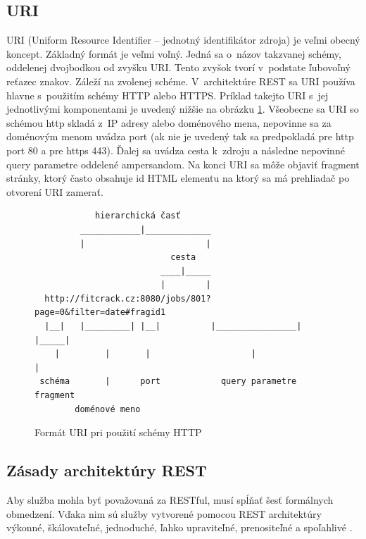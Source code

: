 \documentclass[slovak]{fitthesis}
\begin{document}
\subsection{URI} \label{URI}
URI (Uniform Resource Identifier – jednotný identifikátor zdroja) je veľmi obecný koncept. Základný formát je veľmi voľný. Jedná sa o~názov takzvanej schémy, oddelenej dvojbodkou od zvyšku URI. Tento zvyšok tvorí v~podstate ľubovoľný reťazec znakov. Záleží na zvolenej schéme\cite{URIRFC}. V~architektúre REST sa URI používa hlavne s~použitím schémy HTTP alebo HTTPS. Príklad takejto URI s~jej jednotlivými komponentami je uvedený nižšie na obrázku \ref{fig:formatURI}. Všeobecne sa URI so schémou http skladá z~IP adresy alebo doménového mena, nepovinne sa za doménovým menom uvádza port (ak nie je uvedený tak sa predpokladá pre http port 80 a pre https 443). Ďalej sa uvádza cesta k~zdroju a následne nepovinné query parametre oddelené ampersandom. Na konci URI sa môže objaviť fragment stránky, ktorý často obsahuje id HTML elementu na ktorý sa má prehliadač po otvorení URI zamerať.



\begin{figure}[H]
\begin{center}
\begin{varwidth}{\linewidth}
\begin{verbatim}
            hierarchická časť
         ____________|_____________                  
         |                        |
                           cesta
                         ____|_____
                         |        |
  http://fitcrack.cz:8080/jobs/801?page=0&filter=date#fragid1
  |__|   |_________| |__|          |________________| |_____|
    |         |       |                    |               |
 schéma       |      port            query parametre    fragment
        doménové meno

\end{verbatim}
\end{varwidth}
\end{center}
\caption{Formát URI pri použití schémy HTTP}
\label{fig:formatURI}
\end{figure}



\subsection{Zásady architektúry REST} \label{zasadyREST}
Aby služba mohla byť považovaná za RESTful, musí spĺňať šesť formálnych obmedzení. Vďaka nim sú služby vytvorené pomocou REST architektúry výkonné, škálovateľné, jednoduché, ľahko upraviteľné, prenositeľné a spoľahlivé \cite{masse2011rest}.
\end{document}
